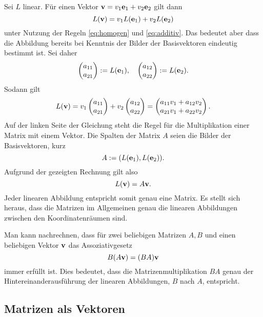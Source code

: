 Sei $L$ linear. Für einen Vektor $\mathbf{v} = v_1\mathbf{e}_1+v_2\mathbf{e}_2$
gilt dann
\[L(\mathbf{v}) = v_1 L(\mathbf{e}_1) + v_2 L(\mathbf{e}_2)\]
unter Nutzung der Regeln \eqref{eq:homogen} und \eqref{eq:additiv}.
Das bedeutet aber dass die Abbildung bereits bei Kenntnis der
Bilder der Basisvektoren eindeutig bestimmt ist. Sei daher
\[\begin{pmatrix}a_{11}\\ a_{21}\end{pmatrix} := L(\mathbf{e}_1),
\quad \begin{pmatrix}a_{12}\\ a_{22}\end{pmatrix} := L(\mathbf{e}_2).\]
Sodann gilt
\[L(\mathbf{v}) = v_1\begin{pmatrix}a_{11}\\ a_{21}\end{pmatrix}
+ v_2\begin{pmatrix}a_{12}\\ a_{22}\end{pmatrix}
= \begin{pmatrix}a_{11}v_1+a_{12}v_2\\ a_{21}v_1+a_{22}v_2\end{pmatrix}.\]
Auf der linken Seite der Gleichung steht die Regel für die
Multiplikation einer Matrix mit einem Vektor.
Die Spalten der Matrix $A$ seien die Bilder der Basisvektoren, kurz
\[A := (L(\mathbf{e}_1),L(\mathbf{e}_2)).\]
Aufgrund der gezeigten Rechnung gilt also
\[L(\mathbf{v}) = A\mathbf{v}.\]
Jeder linearen Abbildung entspricht somit genau eine Matrix. Es stellt
sich heraus, dass die Matrizen im Allgemeinen genau die linearen
Abbildungen zwischen den Koordinatenräumen sind.

Man kann nachrechnen, dass für zwei beliebigen Matrizen $A,B$ und
einen beliebigen Vektor $\mathbf{v}$ das Assoziativgesetz
\[B(A\mathbf{v}) = (BA)\mathbf{v}\]
immer erfüllt ist. Dies bedeutet, dass die Matrizenmultiplikation
$BA$ genau der Hintereinanderausführung der linearen Abbildungen,
$B$ nach $A$, entspricht.

\subsection{Matrizen als Vektoren}

